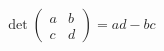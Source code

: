 \documentclass[preview]{standalone}
\begin{document}
\begin{align*}
\det\begin{pmatrix} a & b \\ c & d \end{pmatrix} = ad - bc
\end{align*}
\end{document}
